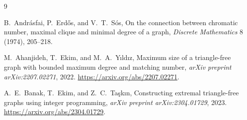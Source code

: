 \documentclass[11pt]{article}
\theoremstyle{definition}
\theoremstyle{remark}
\begin{document}
\begin{thebibliography}{9}

B.~Andr\'asfai, P.~Erd\H{o}s, and V.~T.~S\'os,
\newblock On the connection between chromatic number, maximal clique and
minimal degree of a graph,
\newblock \emph{Discrete Mathematics} 8 (1974), 205--218.

M.~Ahanjideh, T.~Ekim, and M.~A.~Y\i ld\i z,
\newblock Maximum size of a triangle-free graph with bounded maximum degree
and matching number,
\newblock \emph{arXiv preprint arXiv:2207.02271}, 2022.
\newblock \url{https://arxiv.org/abs/2207.02271}.

A.~E.~Banak, T.~Ekim, and Z.~C.~Ta\c{s}k\i n,
\newblock Constructing extremal triangle-free graphs using integer
programming,
\newblock \emph{arXiv preprint arXiv:2304.01729}, 2023.
\newblock \url{https://arxiv.org/abs/2304.01729}.

\end{thebibliography}
\end{document}
